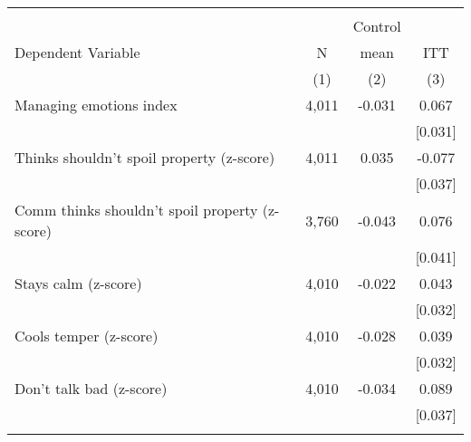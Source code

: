 \begin{tabular}{lccc}
\hline \noalign{\smallskip} &  &  & \\
 &  & Control & \\
Dependent Variable & N & mean & ITT\\
 & (1) & (2) & (3)\\
\noalign{\smallskip}\hline \noalign{\smallskip}Managing emotions index & 4,011 & -0.031 & 0.067\\
 &  &  & [0.031]\\
\quad Thinks shouldn't spoil property (z-score) & 4,011 & 0.035 & -0.077\\
 &  &  & [0.037]\\
\quad Comm thinks shouldn't spoil property (z-score) & 3,760 & -0.043 & 0.076\\
 &  &  & [0.041]\\
\quad Stays calm (z-score) & 4,010 & -0.022 & 0.043\\
 &  &  & [0.032]\\
\quad Cools temper (z-score) & 4,010 & -0.028 & 0.039\\
 &  &  & [0.032]\\
\quad Don't talk bad (z-score) & 4,010 & -0.034 & 0.089\\
 &  &  & [0.037]\\
\noalign{\smallskip}\hline\end{tabular}
